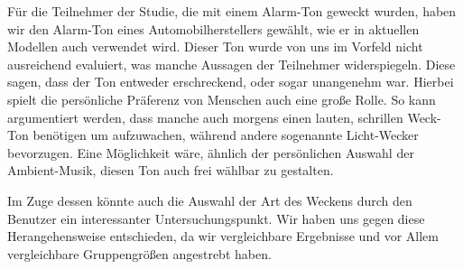 
Für die Teilnehmer der Studie, die mit einem Alarm-Ton geweckt wurden, haben wir den Alarm-Ton eines Automobilherstellers gewählt, wie er in aktuellen Modellen auch verwendet wird.
Dieser Ton wurde von uns im Vorfeld nicht ausreichend evaluiert, was manche Aussagen der Teilnehmer widerspiegeln.
Diese sagen, dass der Ton entweder erschreckend, oder sogar unangenehm war.
Hierbei spielt die persönliche Präferenz von Menschen auch eine große Rolle. So kann argumentiert werden, dass manche auch morgens einen lauten, schrillen Weck-Ton benötigen um aufzuwachen, während andere sogenannte Licht-Wecker bevorzugen. Eine Möglichkeit wäre, ähnlich der persönlichen Auswahl der Ambient-Musik, diesen Ton auch frei wählbar zu gestalten. 

Im Zuge dessen könnte auch die Auswahl der Art des Weckens durch den Benutzer ein interessanter Untersuchungspunkt. Wir haben uns gegen diese Herangehensweise entschieden, da wir vergleichbare Ergebnisse und vor Allem vergleichbare Gruppengrößen angestrebt haben.

